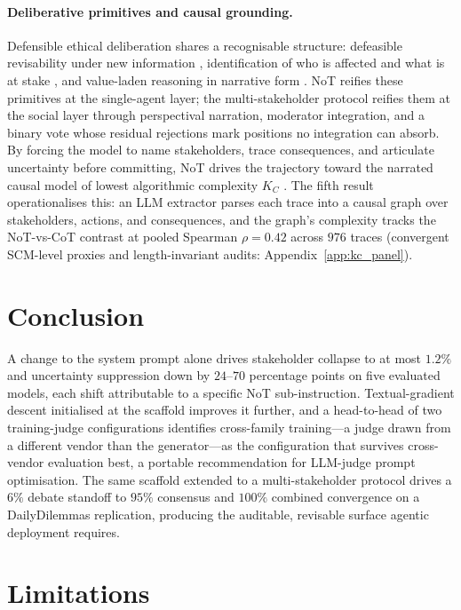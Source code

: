 \documentclass[11pt]{article}
\begin{document}
\paragraph{Deliberative primitives and causal grounding.} Defensible
ethical deliberation shares a recognisable structure: defeasible
revisability under new information \citep{pollock87}, identification
of who is affected and what is at stake \citep{macintyre81}, and
value-laden reasoning in narrative form \citep{bruner86}. NoT
reifies these primitives at the single-agent layer; the
multi-stakeholder protocol reifies them at the social layer through
perspectival narration, moderator integration, and a binary vote
whose residual rejections mark positions no integration can absorb.
By forcing the model to name stakeholders, trace consequences, and
articulate uncertainty before committing, NoT drives the trajectory
toward the narrated causal model \citep{pearl09, pearl95} of lowest
algorithmic complexity $K_C$ \citep{yudkowsky11, li_vitanyi}. The
fifth result operationalises this: an LLM extractor parses each trace
into a causal graph over stakeholders, actions, and consequences, and
the graph's complexity tracks the NoT-vs-CoT contrast at pooled
Spearman $\rho = 0.42$ across $976$ traces
(convergent SCM-level proxies and length-invariant audits:
Appendix~\ref{app:kc_panel}).

\section{Conclusion}
\label{sec:conclusion}

A change to the system prompt alone drives stakeholder
collapse to at most $1.2\%$ and uncertainty suppression down by $24$--$70$
percentage points on five evaluated models, each shift
attributable to a specific NoT sub-instruction. Textual-gradient
descent initialised at the scaffold improves it further, and a
head-to-head of two training-judge configurations identifies
cross-family training---a judge drawn from a different vendor than the
generator---as the configuration that survives cross-vendor evaluation
best, a portable recommendation for LLM-judge prompt optimisation. The
same scaffold extended to a multi-stakeholder protocol drives a $6\%$
debate standoff to $95\%$ consensus and $100\%$ combined convergence on
a DailyDilemmas replication, producing the auditable, revisable surface
agentic deployment requires.

\section*{Limitations}
\end{document}
